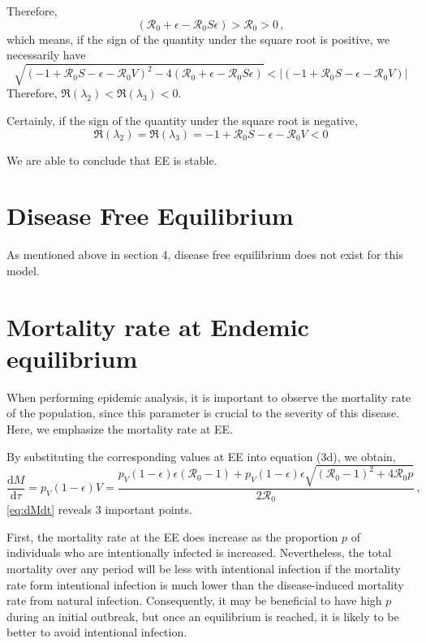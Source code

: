 \documentclass[12pt]{article}
\newcommand\dbyd[2]{\frac{\mathrm d{#1}}{\mathrm d{#2}}}
\newcommand{\R}{\mathcal{R}}
\newcommand{\pmV}{p_{V}}
\begin{document}
Therefore,
\begin{equation}
(\R_0+\epsilon-\R_0 S\epsilon)>\R_0 >0\,,
\end{equation}
which means, if the sign of the quantity under the square root is positive, we necessarily have
\begin{equation}
\sqrt{(-1+\R_0 S-\epsilon-\R_0 V)^2-4(\R_0+\epsilon-\R_0 S\epsilon)}<|(-1+\R_0 S-\epsilon-\R_0 V)|
\end{equation}
Therefore, $\Re(\lambda_2)<\Re(\lambda_3)<0$.

Certainly, if the sign of the quantity under the square root is negative,
\begin{equation}
\Re(\lambda_2)=\Re(\lambda_3)=-1+\R_0 S-\epsilon-\R_0 V<0
\end{equation}

We are able to conclude that EE is stable.
\section{Disease Free Equilibrium}
As mentioned above in section 4, disease free equilibrium does not exist for this model.
\section{Mortality rate at Endemic equilibrium}
When performing epidemic analysis, it is important to observe the mortality rate of the population, since this parameter is crucial to the severity of this disease. Here, we emphasize the mortality rate at EE.

By substituting the corresponding values at EE into equation (3d), we obtain,
\begin{equation}
\dbyd{M}{\tau}=\pmV(1-\epsilon)V=\frac{\pmV(1-\epsilon)\epsilon(\R_0 -1)+ \pmV(1-\epsilon)\epsilon \sqrt{(\R_0-1)^2+4\R_0 p}}{2\R_0}\,, \label{eq:dMdt}
\end{equation}
\autoref{eq:dMdt} reveals 3 important points. 

First, the mortality rate at the EE does increase as the proportion  $p$ of individuals who are intentionally infected is increased.  Nevertheless, the total mortality over any period will be less with intentional infection if the mortality rate form intentional infection is much lower than the disease-induced mortality rate from natural infection.  Consequently, it may be beneficial to have high $p$ during an initial outbreak, but once an equilibrium is reached, it is likely to be better to avoid intentional infection.  
\end{document}
